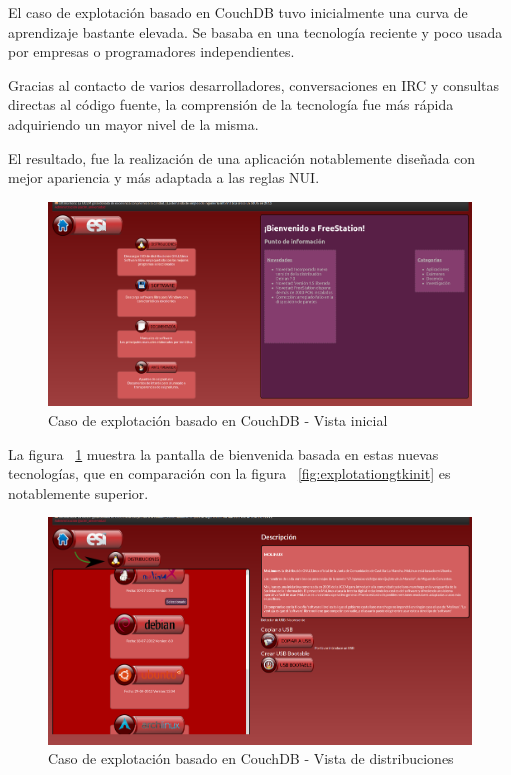El caso de explotación basado en CouchDB tuvo inicialmente una curva de
aprendizaje bastante elevada. Se basaba en una tecnología reciente y poco usada
por empresas o programadores independientes.

Gracias al contacto de varios desarrolladores, conversaciones en IRC y
consultas directas al código fuente, la comprensión de la tecnología fue más
rápida adquiriendo un mayor nivel de la misma.

El resultado, fue la realización de una aplicación notablemente diseñada con
mejor apariencia y más adaptada a las reglas NUI. 

\begin{figure}[ht]
    \begin{center}
        \includegraphics[width=425px]{src/img/couchdb-explotation-case1.png}
        \caption[Caso de explotación basado en CouchDB - Vista inicial] {Caso de
        explotación basado en CouchDB - Vista inicial}
        \label{fig:couchexplotationnui1}
    \end{center}
\end{figure}

La figura ~\ref{fig:couchexplotationnui1} muestra la pantalla de bienvenida
basada en estas nuevas tecnologías, que en comparación con la figura
~\ref{fig:explotationgtkinit} es notablemente superior.

\newpage

\begin{figure}[ht]
    \begin{center}
        \includegraphics[width=425px]{src/img/couchdb-explotation-case2.png}
        \caption[Caso de explotación basado en CouchDB - Vista de distribuciones]
          {Caso de explotación basado en CouchDB - Vista de distribuciones}
          \label{fig:couchexplotationnui2}
    \end{center}
\end{figure}

